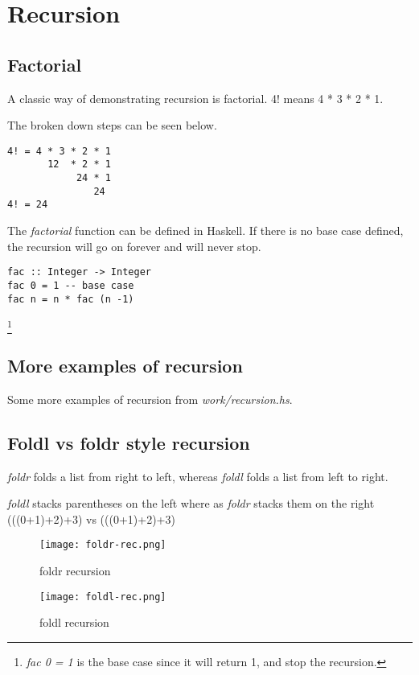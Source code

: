 \section{Recursion}

\subsection{Factorial}
A classic way of demonstrating recursion is factorial. 4! means
4 * 3 * 2 * 1.

The broken down steps can be seen below.

\begin{verbatim}
4! = 4 * 3 * 2 * 1
       12  * 2 * 1
            24 * 1
               24
4! = 24
\end{verbatim}

The \emph{factorial} function can be defined in Haskell.
If there is no base case defined, the recursion will go on forever and will never stop.

\begin{lstlisting}
fac :: Integer -> Integer
fac 0 = 1 -- base case
fac n = n * fac (n -1)
\end{lstlisting}

\footnote{\emph{fac 0 = 1} is the base case since it will return 1, and stop the recursion.}

\subsection{More examples of recursion}
Some more examples of recursion from \emph{work/recursion.hs}.



\newpage
\subsection{Foldl vs foldr style recursion}
\emph{foldr} folds a list from right to left, whereas \emph{foldl} folds
a list from left to right.

\emph{foldl} stacks parentheses on the left where as \emph{foldr} stacks them on the right
(((0+1)+2)+3) vs (((0+1)+2)+3)

\begin{figure}[h]
\texttt{[image: foldr-rec.png]}
\centering
\caption{foldr recursion}
\end{figure}

\begin{figure}[h]
\texttt{[image: foldl-rec.png]}
\centering
\caption{foldl recursion}
\end
{figure}